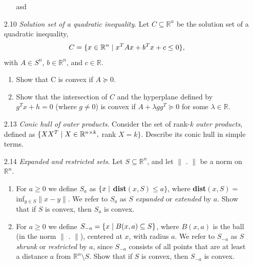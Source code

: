 \documentclass[12pt, oneside]{article}%
\def\R{{\mathbb R}}
\begin{document}
\begin{enumerate}[font=\bfseries]
\begin{enumerate}
    asd
\end{enumerate}

\vspace{5cm}


\item [2.10] \textit{Solution set of a quadratic inequality}. Let $C \subseteq \R^n$ be the solution set of a quadratic inequality, $$C = \{x \in  \R^n \hspace{0.1cm} |\hspace{0.1cm} x^TAx + b^Tx + c \leq 0\},$$  with $A \in S^n$, $b \in \R^n$, and $c \in \R$.
\begin{enumerate}
    \item Show that C is convex if $A 	\succeq 0 $.
    \item Show that the intersection of $C$ and the hyperplane defined by $g^T x + h = 0$ (where $g \neq 0$) is convex if $A + \lambda gg^T \succeq 0$ for some $\lambda \in \R$.
\end{enumerate}

\vspace{5cm}

\item [2.13] \textit{Conic hull of outer products}. Consider the set of rank-\textit{k outer products}, defined as $\{XX^T \hspace{0.1cm}| \hspace{0.1cm} X \in \R^{n\times k}, $ rank $ X = k\}$. Describe its conic hull in simple terms.

\vspace{5cm}

\item [2.14] \textit{Expanded and restricted sets}. Let $S \subseteq \R^n$, and let $\|$ . $ \| $ be a norm on $\R^n$.
\begin{enumerate}
    \item For $a \geq 0$ we define $S_a$ as $\{x \hspace{0.1cm} | $\textbf{ dist}$(x,S) \leq a\}$, where \textbf{dist}$(x,S) =$ inf$_{y\in S} \| x-y \| $. We refer to $S_a$ as $S$ \textit{expanded} or \textit{extended} by $a$. Show that if $S$ is convex, then $S_a$ is convex.
    \item For $a \geq 0$ we define $S_{-a} = \{x\hspace{0.1cm} |\hspace{0.1cm} B(x, a) \subseteq S\}$, where $B(x, a)$ is the ball (in the norm $\|$ . $ \| $), centered at $x$, with radius $a$. We refer to $S_{-a}$ as $S$ \textit{shrunk} or \textit{restricted} by $a$, since $S_{-a}$ consists of all points that are at least a distance $a$ from $ \R^n\setminus S$. Show that if $S$ is convex, then $S_{-a}$ is convex.
\end{enumerate}


\end{enumerate}
\end{document}
